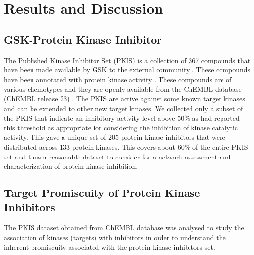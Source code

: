 \documentclass[a4paper, 11pt]{article}
\begin{document}
\section*{Results and Discussion}
\subsection*{GSK-Protein Kinase Inhibitor}
The Published Kinase Inhibitor Set (PKIS) is a collection of 367 compounds that have been made available by GSK to the external community \cite{dranchak2013profile, knapp2013public}. These compounds have been annotated with protein kinase  activity \cite{knapp2013public}. These compounds are of various chemotypes and they are openly available from the ChEMBL database (ChEMBL release 23) \cite{gaulton2016chembl}. The PKIS are active against some known target kinases and can be extended to other new target kinases. We collected only a subset of the PKIS that indicate an inhibitory activity level above 50\% as \cite{dranchak2013profile,  anastassiadis2011comprehensive} had reported this threshold as appropriate for considering the inhibition of kinase catalytic activity. This gave a unique set of 205 protein kinase inhibitors that were distributed across 133 protein kinases. This covers about 60\% of the entire PKIS set and thus a reasonable dataset to consider for a network assessment and characterization of protein kinase inhibition.

\subsection*{Target Promiscuity of Protein Kinase Inhibitors}
The PKIS dataset obtained from ChEMBL database was analysed to study the association of kinases (targets) with inhibitors in order to understand the inherent promiscuity associated with the protein kinase inhibitors set. 
\end{document}

